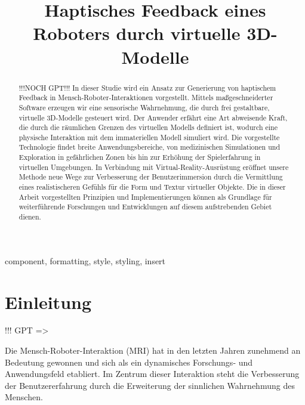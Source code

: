 \documentclass[conference]{IEEEtran}
\begin{document}
\title{Haptisches Feedback eines Roboters durch virtuelle 3D-Modelle}

\author{
    \and
}
\maketitle

\begin{abstract}
!!!NOCH GPT!!!
In dieser Studie wird ein Ansatz zur Generierung von haptischem Feedback in Mensch-Roboter-Interaktionen vorgestellt. Mittels maßgeschneiderter Software erzeugen wir eine sensorische Wahrnehmung, die durch frei gestaltbare, virtuelle 3D-Modelle gesteuert wird. Der Anwender erfährt eine Art abweisende Kraft, die durch die räumlichen Grenzen des virtuellen Modells definiert ist, wodurch eine physische Interaktion mit dem immateriellen Modell simuliert wird. Die vorgestellte Technologie findet breite Anwendungsbereiche, von medizinischen Simulationen und Exploration in gefährlichen Zonen bis hin zur Erhöhung der Spielerfahrung in virtuellen Umgebungen. In Verbindung mit Virtual-Reality-Ausrüstung eröffnet unsere Methode neue Wege zur Verbesserung der Benutzerimmersion durch die Vermittlung eines realistischeren Gefühls für die Form und Textur virtueller Objekte. Die in dieser Arbeit vorgestellten Prinzipien und Implementierungen können als Grundlage für weiterführende Forschungen und Entwicklungen auf diesem aufstrebenden Gebiet dienen.
\end{abstract}

\begin{IEEEkeywords}
    component, formatting, style, styling, insert
\end{IEEEkeywords}

\section{Einleitung}
!!! GPT =>

Die Mensch-Roboter-Interaktion (MRI) hat in den letzten Jahren zunehmend an Bedeutung gewonnen und sich als ein dynamisches Forschungs- und Anwendungsfeld etabliert. Im Zentrum dieser Interaktion steht die Verbesserung der Benutzererfahrung durch die Erweiterung der sinnlichen Wahrnehmung des Menschen.
\end{document}
